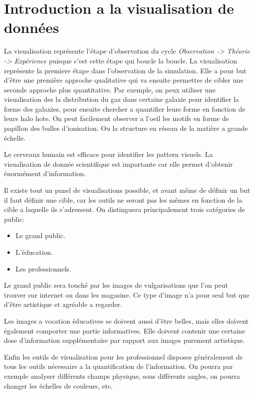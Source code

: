 \section{Introduction a la visualisation de données}

La visualisation représente l'étape d'observation du cycle \textit{Observation -> Théorie -> Expérience} puisque c'est cette étape qui boucle la boucle.
La visualisation représente la premiere étape dans l'observation de la simulation.
Elle a pour but d'être une première approche qualitative qui va ensuite permettre de cibler une seconde approche plus quantitative.
Par exemple, on peux utiliser une visualisation des la distribution du gaz dans certaine galaxie pour identifier la forme des galaxies, pour ensuite chercher a quantifier leurs forme en fonction de leurs halo hote.
On peut facilement observer a l'oeil les motifs en forme de papillon des bulles d'ionisation.
Ou la structure en réseau de la matière a grande échelle.

Le cerveaux humain est efficace pour identifier les pattern visuels. 
La visualisation de donnée scientifique est importante car elle permet d'obtenir énormément d'information.

Il existe tout un panel de visualisations possible, et avant même de définir un but il faut définir une cible, car les outils ne seront pas les mêmes en fonction de la cible a laquelle ils s'adressent.
On distinguera principalement trois catégories de public:

\begin{itemize}
\item Le grand public.
\item L'éducation.
\item Les professionnels.
\end{itemize}

Le grand public sera touché par les images de vulgarisations que l'on peut trouver sur internet ou dans les magasine.
Ce type d'image n'a pour seul but que d'être artistique et agréable a regarder.

Les images a vocation éducatives se doivent aussi d'être belles, mais elles doivent également comporter une partie informatives.
Elle doivent contenir une certaine dose d'information supplémentaire par rapport aux images purement artistique.

Enfin les outils de visualisation pour les professionnel disposes généralement de tous les outils nécessaire a la quantification de l'information.
On pourra par exemple analyser différents champs physique, sous différents angles, on pourra changer les échelles de couleurs, etc.

